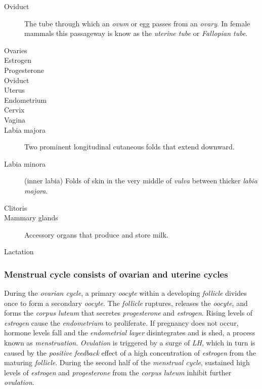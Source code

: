 \documentclass[11pt]{article}
\begin{document}
\begin{description}
\item[{Oviduct}] The tube through which an \emph{ovum} or egg passes from an \emph{ovary}. In
female mammals this passageway is know as the \emph{uterine tube} or \emph{Fallopian
tube}.
\item[{Ovaries}] 

\item[{Estrogen}] 

\item[{Progesterone}] 

\item[{Oviduct}] 


\item[{Uterus}] 

\item[{Endometrium}] 

\item[{Cervix}] 

\item[{Vagina}] 

\item[{Labia majora}] Two prominent longitudinal cutaneous folds that extend
downward.
\item[{Labia minora}] (inner labia) Folds of skin in the very middle of \emph{vulva}
between thicker \emph{labia majora}.
\item[{Clitoris}] 


\item[{Mammary glands}] Accessory organs that produce and store milk.
\item[{Lactation}] 
\end{description}

\subsubsection{Menstrual cycle consists of ovarian and uterine cycles}
\label{sec:org3dd8f6d}
During the \emph{ovarian cycle}, a primary \emph{oocyte} within a developing \emph{follicle} divides
once to form a secondary \emph{oocyte}. The \emph{follicle} ruptures, releases the \emph{oocyte}, and
forms the \emph{corpus luteum} that secretes \emph{progesterone} and \emph{estrogen}. Rising levels
of \emph{estrogen} cause the \emph{endometrium} to proliferate. If pregnancy does not occur,
hormone levels fall and the \emph{endometrial layer} disintegrates and is shed, a
process known as \emph{menstruation}. \emph{Ovulation} is triggered by a surge of \emph{LH}, which in
turn is caused by the \emph{positive feedback} effect of a high concentration of
\emph{estrogen} from the maturing \emph{follicle}. During the second half of the \emph{menstrual
cycle}, sustained high levels of \emph{estrogen} and \emph{progesterone} from the \emph{corpus luteum}
inhibit further \emph{ovulation}.
\end{document}
